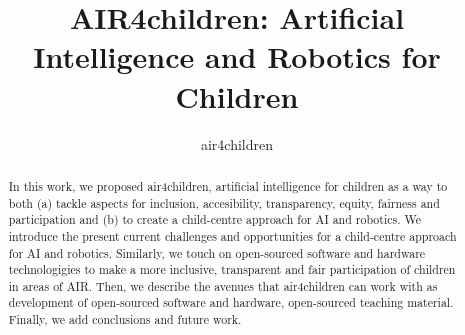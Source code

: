 \documentclass[sigconf]{acmart}
\begin{document}
\title{AIR4children: Artificial Intelligence and Robotics for Children}


\author{air4children}


\renewcommand{\shortauthors}{Lastname et al.}

\begin{abstract}
In this work, we proposed air4children, artificial intelligence for children as a way to both (a) tackle aspects for inclusion, accesibility, transparency, equity, fairness and participation and (b) to create a child-centre approach for AI and robotics.
We introduce the present current challenges and opportunities for a child-centre approach for AI and robotics. 
Similarly, we touch on open-sourced software and hardware technologigies to make a more inclusive, transparent and fair participation of children in areas of AIR. 
Then, we describe the avenues that air4children can work with as development of open-sourced software and hardware, open-sourced teaching material. 
Finally, we add conclusions and future work. 
\end{abstract}
\end{document}
